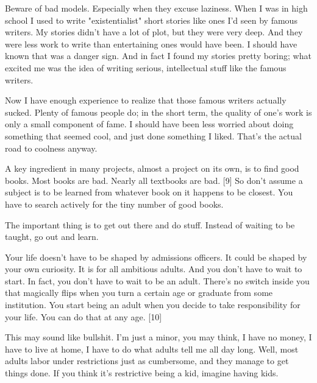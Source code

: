 Beware
                  of bad models. Especially when they excuse laziness. When I
                  was in high school I used to write "existentialist" short
                  stories like ones I'd seen by famous writers. My stories
                  didn't have a lot of plot, but they were very deep. And they
                  were less work to write than entertaining ones would have
                  been. I should have known that was a danger sign. And in fact
                  I found my stories pretty boring; what excited me was the idea
                  of writing serious, intellectual stuff like the famous
                  writers.

Now I have enough experience to realize
                  that those famous writers actually sucked. Plenty of famous
                  people do; in the short term, the quality of one's work is
                  only a small component of fame. I should have been less
                  worried about doing something that seemed cool, and just done
                  something I liked. That's the actual road to coolness
                  anyway.

A key ingredient in many projects, almost a
                  project on its own, is to find good books. Most books are bad.
                  Nearly all textbooks are bad. [9] So don't assume a subject is
                  to be learned from whatever book on it happens to be closest.
                  You have to search actively for the tiny number of good
                  books.

The important thing is to get out there and
                  do stuff. Instead of waiting to be taught, go out and
                  learn.

Your life doesn't have to be shaped by
                  admissions officers. It could be shaped by your own curiosity.
                  It is for all ambitious adults. And you don't have to wait to
                  start. In fact, you don't have to wait to be an adult. There's
                  no switch inside you that magically flips when you turn a
                  certain age or graduate from some institution. You start being
                  an adult when you decide to take responsibility for your life.
                  You can do that at any age. [10]

This may sound
                  like bullshit. I'm just a minor, you may think, I have no
                  money, I have to live at home, I have to do what adults tell
                  me all day long. Well, most adults labor under restrictions
                  just as cumbersome, and they manage to get things done. If you
                  think it's restrictive being a kid, imagine having kids.

